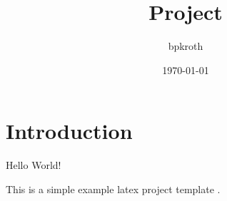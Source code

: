 \documentclass{article}
\title{Project}
\author{bpkroth}
\date{\today}
\begin{document}
\maketitle

\section{Introduction}

Hello World!
\cite{doernerVirtualUndAugmented2019}

This is a simple example latex project template \cite{latex-project-template}.



\end{document}
